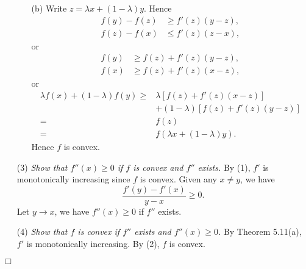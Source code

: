 \documentclass{article}
\begin{document}
\begin{enumerate}
\begin{enumerate}
  \item[(b)]
  Write $z = \lambda x + (1-\lambda)y$.
  Hence
  \begin{align*}
    f(y)-f(z) &\geq f'(z)(y-z), \\
    f(z)-f(x) &\leq f'(z)(z-x),
  \end{align*}
  or
  \begin{align*}
    f(y) &\geq f(z) + f'(z)(y-z), \\
    f(x) &\geq f(z) + f'(z)(x-z),
  \end{align*}
  or
  \begin{align*}
    \lambda f(x) + (1-\lambda)f(y)
    \geq&
    \lambda [f(z) + f'(z)(x-z)] \\
      &+ (1-\lambda)[f(z) + f'(z)(y-z)] \\
    =& f(z) \\
    =& f(\lambda x + (1-\lambda)y).
  \end{align*}
  Hence $f$ is convex.
  \end{enumerate}

\item[(3)]
  \emph{Show that $f''(x) \geq 0$ if $f$ is convex and $f''$ exists.}
  By (1), $f'$ is monotonically increasing since $f$ is convex.
  Given any $x \neq y$, we have
  \[
    \frac{f'(y)-f'(x)}{y - x} \geq 0.
  \]
  Let $y \to x$, we have $f''(x) \geq 0$ if $f''$ exists.

\item[(4)]
  \emph{Show that $f$ is convex if $f''$ exists and $f''(x) \geq 0$.}
  By Theorem 5.11(a), $f'$ is monotonically increasing.
  By (2), $f$ is convex.
\end{enumerate}
$\Box$ \\\\



\end{document}
